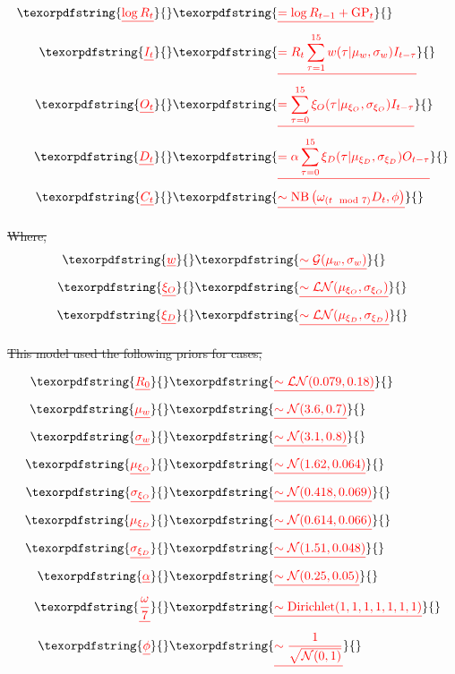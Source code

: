 \documentclass[10pt,letterpaper]{article}
\providecommand{\DIFdeltex}[1]{{\protect\color{red}\sout{#1}}}                      %
\providecommand{\DIFdel}[1]{\texorpdfstring{\DIFdeltex{#1}}{}} %
\begin{document}
\begin{align*}
  \DIFdel{\log R_{t} }&\DIFdel{= \log R_{t-1} + \mathrm{GP}_t }\\
  \DIFdel{I_t }&\DIFdel{= R_t \sum_{\tau = 1}^{15} w(\tau | \mu_{w}, \sigma_{w}) I_{t - \tau} }\\
  \DIFdel{O_t }&\DIFdel{= \sum_{\tau = 0}^{15} \xi_{O}(\tau | \mu_{\xi_{O}}, \sigma_{\xi_{O}}) I_{t-\tau} }\\
  \DIFdel{D_t }&\DIFdel{= \alpha \sum_{\tau = 0}^{15} \xi_{D}(\tau | \mu_{\xi_{D}}, \sigma_{\xi_{D}}) O_{t-\tau} }\\ 
  \DIFdel{C_t }&\DIFdel{\sim \mathrm{NB}\left(\omega_{(t \mod 7)}D_t, \phi\right)
}\end{align*}%

\DIFdel{Where, }\begin{align*}
     \DIFdel{w }&\DIFdel{\sim \mathcal{G}(\mu_{w}, \sigma_{w}) }\\
    \DIFdel{\xi_{O} }&\DIFdel{\sim \mathcal{LN}(\mu_{\xi_{O}}, \sigma_{\xi_{O}}) }\\
    \DIFdel{\xi_{D} }&\DIFdel{\sim \mathcal{LN}(\mu_{\xi_{D}}, \sigma_{\xi_{D}}) 
}\end{align*}%

\DIFdel{This model used the following priors for cases,
}%

\begin{align*}
     \DIFdel{R_0 }&\DIFdel{\sim \mathcal{LN}(0.079, 0.18) }\\
    \DIFdel{\mu_w }&\DIFdel{\sim \mathcal{N}(3.6, 0.7) }\\
    \DIFdel{\sigma_w }&\DIFdel{\sim \mathcal{N}(3.1, 0.8) }\\
    \DIFdel{\mu_{\xi_{O}} }&\DIFdel{\sim \mathcal{N}(1.62, 0.064) }\\
    \DIFdel{\sigma_{\xi_{O}} }&\DIFdel{\sim \mathcal{N}(0.418, 0.069) }\\
    \DIFdel{\mu_{\xi_{D}} }&\DIFdel{\sim \mathcal{N}(0.614, 0.066) }\\
    \DIFdel{\sigma_{\xi_{D}} }&\DIFdel{\sim \mathcal{N}(1.51, 0.048) }\\
    \DIFdel{\alpha }&\DIFdel{\sim \mathcal{N}(0.25, 0.05) }\\
    \DIFdel{\frac{\omega}{7} }&\DIFdel{\sim \mathrm{Dirichlet}(1, 1, 1, 1, 1, 1, 1) }\\
    \DIFdel{\phi }&\DIFdel{\sim \frac{1}{\sqrt{\mathcal{N}(0, 1)}}
}\end{align*}%
\end{document}
